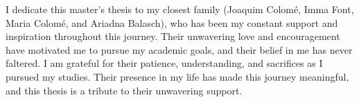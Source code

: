 
\begin{dedication}
I dedicate this master's thesis to my closest family (Joaquim Colomé, Imma Font, Maria Colomé, and Ariadna Balasch), who has been my constant support and inspiration throughout this journey. Their unwavering love and encouragement have motivated me to pursue my academic goals, and their belief in me has never faltered. I am grateful for their patience, understanding, and sacrifices as I pursued my studies. Their presence in my life has made this journey meaningful, and this thesis is a tribute to their unwavering support. 
\newpage

\end{dedication}
